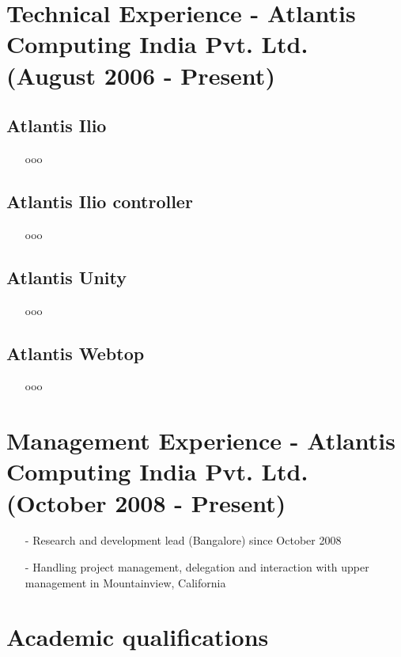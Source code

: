 \documentclass[a4paper,12pt]{article}
\begin{document}
\section{Technical Experience - Atlantis Computing India
  Pvt. Ltd. (August 2006 - Present)}
\subsection{Atlantis Ilio}
\begin{itemize}
\item[] ooo
\end{itemize}

\subsection{Atlantis Ilio controller}
\begin{itemize}
\item[] ooo
\end{itemize}

\subsection{Atlantis Unity}
\begin{itemize}
\item[] ooo
\end{itemize}

\subsection{Atlantis Webtop}
\begin{itemize}
\item[] ooo
\end{itemize}

\section{Management Experience - Atlantis Computing India
  Pvt. Ltd. (October 2008 - Present)}
\begin{itemize}
  \item[-] Research and development lead (Bangalore) since October
    2008
  \item[-] Handling project management, delegation and interaction
    with upper management in Mountainview, California
\end{itemize}

\section{Academic qualifications}
\end{document}
